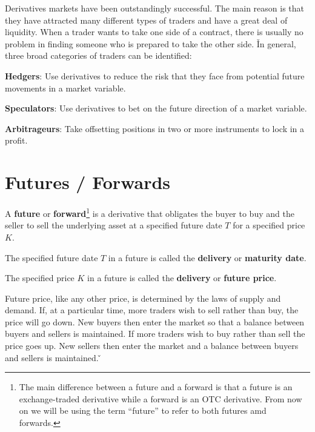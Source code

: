 Derivatives markets have been outstandingly successful. The main reason is that they have attracted many different
types of traders and have a great deal of liquidity. When a trader wants to take one side of a contract, there is
usually no problem in finding someone who is prepared to take the other side. \v

In general, three broad categories of traders can be identified:
\bit
\item \textbf{Hedgers}: Use derivatives to reduce the risk that they face from potential future movements in a market
variable.
\item \textbf{Speculators}: Use derivatives to bet on the future direction of a market variable.
\item \textbf{Arbitrageurs}: Take offsetting positions in two or more instruments to lock in a profit.
\eit

\section{Futures / Forwards}

A \textbf{future} or \textbf{forward}\footnote{The main difference between a future and a forward is that a future is an
exchange-traded derivative while a forward is an OTC derivative. From now on we will be using the term ``future'' to
refer to both futures amd forwards.} is a derivative that obligates the buyer to buy and the seller to sell the
underlying asset at a specified future date $T$ for a specified price $K$.
\ed

The specified future date $T$ in a future is called the \textbf{delivery} or \textbf{maturity date}.
\ed

The specified price $K$ in a future is called the \textbf{delivery} or \textbf{future price}.
\ed

Future price, like any other price, is determined by the laws of supply and demand. If, at a particular time, more
traders wish to sell rather than buy, the price will go down. New buyers then enter the market so that a balance
between buyers and sellers is maintained. If more traders wish to buy rather than sell the price goes up. New
sellers then enter the market and a balance between buyers and sellers is maintained. \v

